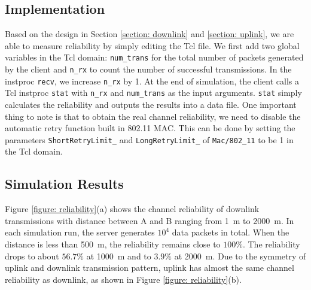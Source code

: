 \documentclass{article}
\begin{document}
\subsection{Implementation}
Based on the design in Section \ref{section: downlink} and \ref{section: uplink}, we are able to measure reliability by simply editing the Tcl file. We first add two global variables in the Tcl domain: \lstinline|num_trans| for the total number of packets generated by the client and \lstinline|n_rx| to count the number of successful transmissions. In the instproc \lstinline|recv|, we increase \lstinline|n_rx| by 1. At the end of simulation, the client calls a Tcl instproc \lstinline|stat| with \lstinline|n_rx| and \lstinline|num_trans| as the input arguments. \lstinline|stat| simply calculates the reliability and outputs the results into a data file. One important thing to note is that to obtain the real channel reliability, we need to disable the automatic retry function built in 802.11 MAC. This can be done by setting the parameters \lstinline|ShortRetryLimit_| and \lstinline|LongRetryLimit_| of \lstinline|Mac/802_11| to be 1 in the Tcl domain.

\subsection{Simulation Results}
Figure \ref{figure: reliability}(a) shows the channel reliability of downlink transmissions with distance between A and B ranging from \SI{1}{m} to \SI{2000}{m}. In each simulation run, the server generates $10^4$ data packets in total. When the distance is less than \SI{500}{m}, the reliability remains close to $100\%$. The reliability drops to about $56.7\%$ at \SI{1000}{m} and to $3.9\%$ at \SI{2000}{m}. Due to the symmetry of uplink and downlink transmission pattern, uplink has almost the same channel reliability as downlink, as shown in Figure \ref{figure: reliability}(b).
\end{document}
